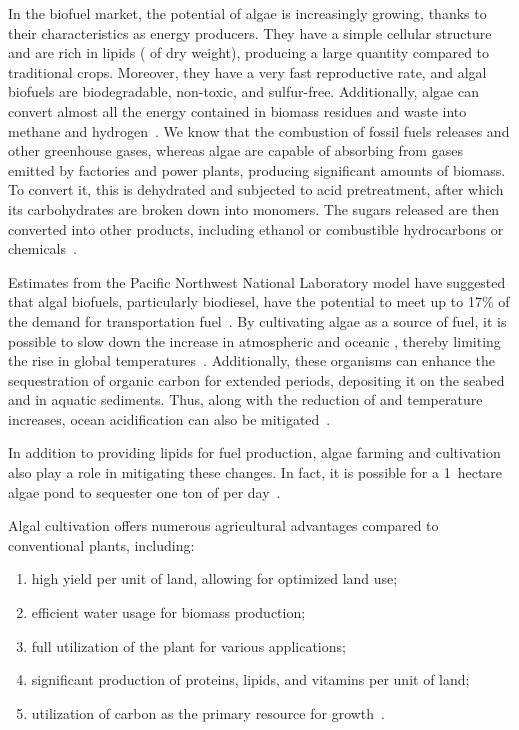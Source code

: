 In the biofuel market, the potential of algae is increasingly growing, thanks to their characteristics as energy producers. They have a simple cellular structure and are rich in lipids ( of dry weight), producing a large quantity compared to traditional crops. Moreover, they have a very fast reproductive rate, and algal biofuels are biodegradable, non-toxic, and sulfur-free. Additionally, algae can convert almost all the energy contained in biomass residues and waste into methane and hydrogen~\parencite{suganya_Macroalgae_2016}. We know that the combustion of fossil fuels releases  and other greenhouse gases, whereas algae are capable of absorbing  from gases emitted by factories and power plants, producing significant amounts of biomass. To convert it, this is dehydrated and subjected to acid pretreatment, after which its carbohydrates are broken down into monomers. The sugars released are then converted into other products, including ethanol or combustible hydrocarbons or chemicals~\parencite{salami_AlgaeBased_2021}.

Estimates from the Pacific Northwest National Laboratory model have suggested that algal biofuels, particularly biodiesel, have the potential to meet up to 17\% of the demand for transportation fuel~\parencite{dalrymple_Wastewater_2013}. By cultivating algae as a source of fuel, it is possible to slow down the increase in atmospheric and oceanic , thereby limiting the rise in global temperatures~\parencite{raven_possible_2017}. Additionally, these organisms can enhance the sequestration of organic carbon for extended periods, depositing it on the seabed and in aquatic sediments. Thus, along with the reduction of  and temperature increases, ocean acidification can also be mitigated~\parencite{prasad_Role_2021}.

In addition to providing lipids for fuel production, algae farming and cultivation also play a role in mitigating these changes. In fact, it is possible for a 1~hectare algae pond to sequester one ton of  per day~\parencite{proksch_growing_2013}.

Algal cultivation offers numerous agricultural advantages compared to conventional plants, including:
\begin{enumerate}
\item high yield per unit of land, allowing for optimized land use;
\item efficient water usage for biomass production;
\item full utilization of the plant for various applications;
\item significant production of proteins, lipids, and vitamins per unit of land;
\item utilization of carbon as the primary resource for growth~\parencite{sivakumar_role_2013s}.
\end{enumerate}

